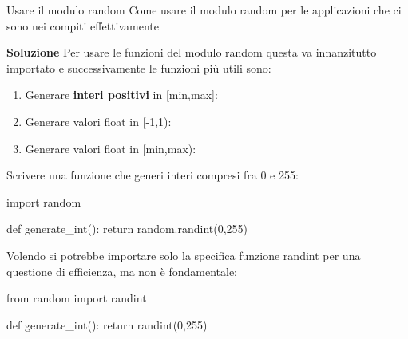 \documentclass[10pt]{article}
\makeatletter
\newcommand{\<}{\langle}
\renewcommand{\>}{\rangle}
\renewenvironment{proof}[1][\proofname] {\par\pushQED{\qed}
\renewcommand*{\proofname}{Soluzione}
{\normalfont\sffamily\bfseries\topsep6\p@\@plus6\p@\relax #1\@addpunct{.} }}{\popQED\endtrivlist\@endpefalse}
\theoremstyle{mystyle}{\newtheorem*{remark}{Nota}}
\theoremstyle{mystyle}{\newtheorem*{remarks}{Note}}
\theoremstyle{mystyle}{\newtheorem*{example}{Esempio}}
\theoremstyle{mystyle}{\newtheorem*{examples}{Esempi}}
\theoremstyle{definition}{\newtheorem*{exercise}{Exercise}}
\theoremstyle{warn}
\makeatother
\begin{document}
\begin{definition}{Usare il modulo random}
Come usare il modulo random per le applicazioni che ci sono nei compiti effettivamente
\end{definition}
\begin{proof}
Per usare le funzioni del modulo random questa va innanzitutto importato  e successivamente le funzioni più utili sono:
\begin{enumerate}
    \item Generare \textbf{interi positivi} in [min,max]: 
    \item Generare valori float in [-1,1): 
    \item Generare valori float in [min,max): 
\end{enumerate}
\end{proof}
\begin{example}
Scrivere una funzione che generi interi compresi fra 0 e 255:
\begin{python}
import random

def generate_int():
    return random.randint(0,255)
\end{python}
\end{example}
\begin{remark}
Volendo si potrebbe importare solo la specifica funzione randint per una questione di efficienza, ma non è fondamentale:
\begin{python}
from random import randint

def generate_int():
    return randint(0,255)
\end{python}
\end{remark}
\end{document}
